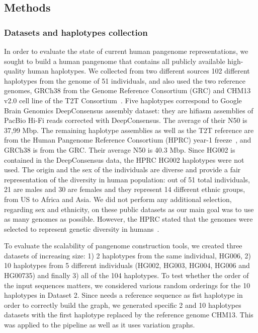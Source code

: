 \subsection{Methods}
\subsubsection*{\textbf{Datasets and haplotypes collection}}
\label{sec:datasets}
In order to evaluate the state of current human pangenome representations, we sought to build a human pangenome that contains all publicly available high-quality human haplotypes. We collected from two different sources 102 different haplotypes from the genome of 51 individuals, and also used the two reference genomes, GRCh38 from the Genome Reference Consortium (GRC) \cite{grc} and CHM13 v2.0 cell line of the T2T Consortium~\cite{t2t}.
Five haplotypes correspond to Google Brain Genomics DeepConsensus \cite{deepconsensus} assembly dataset: they are hifiasm assemblies of PacBio Hi-Fi reads corrected with DeepConsensus. The average of their N50 is 37,99 Mbp. 
The remaining haplotype assemblies as well as the T2T reference are from the Human Pangenome Reference Consortium (HPRC) year-1 freeze~\cite{hpp}, and GRCh38 is from the GRC. Their average N50 is 40.3 Mbp. Since HG002 is contained in the DeepConsensus data, the HPRC HG002 haplotypes were not used.
The origin and the sex of the individuals are diverse %
and provide a fair representation of the diversity in human population: out of 51 total individuals, 21 are males and 30 are females and they represent 14 different ethnic groups, from US to Africa and Asia. We did not perform any additional selection, regarding sex and ethnicity, on these public datasets as our main goal was to use as many genomes as possible. However, the HPRC stated that the genomes were selected to represent genetic diversity in humans~\mbox{\cite{hdpr}}.

To evaluate the scalability of pangenome construction tools, we created three datasets of increasing size: 1) 2 haplotypes from the same individual, HG006, 2) 10 haplotypes from 5 different individuals (HG002, HG003, HG004, HG006 and HG00735) and finally 3) all of the 104 haplotypes. To test whether the order of the input sequences matters, we considered various random orderings for the 10 haplotypes in Dataset 2. Since \minigraph needs a reference sequence as fist haplotype in order to correctly build the graph, we generated specific 2 and 10 haplotypes datasets with the first haplotype replaced by the reference genome CHM13. This was applied to the \mcactus pipeline as well as it uses \minigraph variation graphs.

